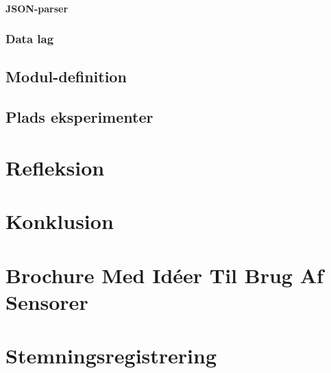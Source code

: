 \subsubsection{JSON-parser}\label{subsub:JSONparser}


\subsection{Data lag}


\section{Modul-definition}\label{modul_definition}


\section{Plads eksperimenter}\label{eksperimenter}


\chapter{Refleksion}


\chapter{Konklusion}




\label{bib:mybiblio}

\appendix



\chapter{Brochure Med Idéer Til Brug Af Sensorer}\label{app:brochure}
 

\chapter{Stemningsregistrering}\label{app:stemningsregistrering}


